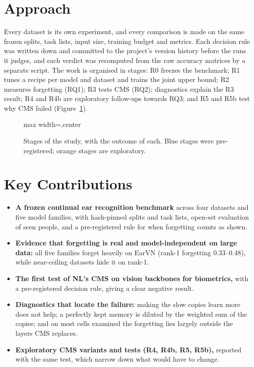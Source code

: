 \documentclass[12pt,a4paper]{report}
\newcommand{\diagram}[1]{\begin{adjustbox}{max width=\textwidth,center}\end{adjustbox}}
\begin{document}
\section{Approach}
Every dataset is its own experiment, and every comparison is made on the same frozen splits, task lists, input size, training budget and metrics. Each decision rule was written down and committed to the project's version history before the runs it judges, and each verdict was recomputed from the raw accuracy matrices by a separate script. The work is organised in stages: R0 freezes the benchmark; R1 tunes a recipe per model and dataset and trains the joint upper bound; R2 measures forgetting (RQ1); R3 tests CMS (RQ2); diagnostics explain the R3 result; R4 and R4b are exploratory follow-ups towards RQ3; and R5 and R5b test why CMS failed (Figure~\ref{fig:pipeline}).

\begin{figure}[H]
\centering
\diagram{pipeline}
\caption{Stages of the study, with the outcome of each. Blue stages were pre-registered; orange stages are exploratory.}
\label{fig:pipeline}
\end{figure}

\section{Key Contributions}
\begin{itemize}
\item \textbf{A frozen continual ear recognition benchmark} across four datasets and five model families, with hash-pinned splits and task lists, open-set evaluation of seen people, and a pre-registered rule for when forgetting counts as shown.
\item \textbf{Evidence that forgetting is real and model-independent on large data:} all five families forget heavily on EarVN (rank-1 forgetting 0.33--0.48), while near-ceiling datasets hide it on rank-1.
\item \textbf{The first test of NL's CMS on vision backbones for biometrics,} with a pre-registered decision rule, giving a clear negative result.
\item \textbf{Diagnostics that locate the failure:} making the slow copies learn more does not help; a perfectly kept memory is diluted by the weighted sum of the copies; and on most cells examined the forgetting lies largely outside the layers CMS replaces.
\item \textbf{Exploratory CMS variants and tests (R4, R4b, R5, R5b),} reported with the same test, which narrow down what would have to change.
\end{itemize}
\end{document}
